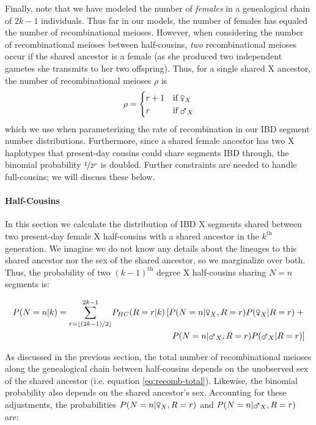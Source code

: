 \documentclass[11pt]{article}
\newcommand{\msxa}{\mars_X}
\newcommand{\fsxa}{\venus_X}
\begin{document}
Finally, note that we have modeled the number of \emph{females} in a
genealogical chain of $2k-1$ individuals. Thus far in our models, the number of
females has equaled the number of recombinational meioses. However, when
considering the number of recombinational meioses between half-cousins,
\emph{two} recombinational meioses occur if the shared ancestor is a female (as
she produced two independent gametes she transmits to her two offspring). Thus,
for a single shared X ancestor, the number of recombinational meioses $\rho$ is
%
\begin{equation}
  \rho = \begin{cases}
        r + 1 & \text{if} \; \fsxa\\
        r & \text{if} \; \msxa\\
      \end{cases}
\label{eq:recomb-total}
\end{equation}
%
which we use when parameterizing the rate of recombination in our IBD segment
number distributions. Furthermore, since a shared female ancestor has two X
haplotypes that present-day cousins could share segments IBD through, the
binomial probability $\nicefrac{1}{2^\rho}$ is doubled. Further constraints are
needed to handle full-cousins; we will discuss these below.

\paragraph{Half-Cousins}
\label{p:ibd-seg-num-x}

In this section we calculate the distribution of IBD X segments shared between
two present-day female X half-cousins with a shared ancestor in the $k^\text{th}$
generation. We imagine we do not know any details about the lineages to this
shared ancestor nor the sex of the shared ancestor, so we marginalize over
both. Thus, the probability of two $(k-1)^\text{th}$ degree X half-cousins
sharing $N=n$ segments is:

\begin{align}
  \label{eq:prob-n-half-cousins}
  P(N=n | k)  = {\sum_{r=\lfloor (2k-1)/2 \rfloor}^{2k-1}} P_{HC}(R=r | k) \left[  P(N = n | \fsxa, R=r) P(\fsxa | R=r) \; + \right. \nonumber \\
    \left. P(N = n | \msxa, R=r) P(\msxa | R=r) \right]
\end{align}

As discussed in the previous section, the total number of recombinational
meioses along the genealogical chain between half-cousins depends on the
unobserved sex of the shared ancestor (i.e. equation \eqref{eq:recomb-total}).
Likewise, the binomial probability also depends on the shared ancestor's sex.
Accounting for these adjustments, the probabilities $P(N = n | \fsxa, R=r)$ and
$P(N = n | \msxa, R=r)$ are:
\end{document}

